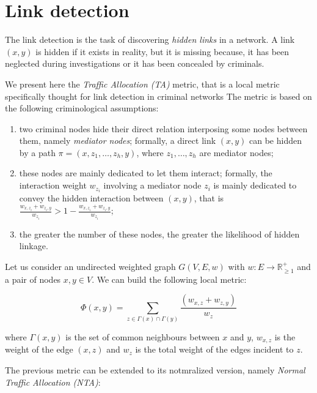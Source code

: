 \section{Link detection}
\label{sec:link-detection}

The link detection is the task of discovering \textit{hidden links} in a network. 
A link $(x,y)$ is hidden if it exists in reality, but it is missing because, it has been neglected during investigations or it has been concealed by criminals.

We present here the \textit{Traffic Allocation (TA)} metric, that is a local metric specifically thought for link detection in criminal networks 
The metric is based on the following criminological assumptions: 

\begin{enumerate}
	\item two criminal nodes hide their direct relation interposing some nodes between them, namely \textit{mediator nodes}; formally, a direct link $(x,y)$ can be hidden by a path $\pi=(x,z_{1},\ldots,z_{h},y)$, where $z_{1},\ldots,z_{h}$ are mediator nodes;
	
	\item these nodes are mainly dedicated to let them interact; formally, the interaction weight $w_{z_{i}}$ involving a mediator node $z_{i}$ is mainly dedicated to convey the hidden interaction between $(x,y)$, that is $\frac{w_{x,z_{i}}+w_{z_{i},y}}{w_{z_{i}}} > 1- \frac{w_{x,z_{i}}+w_{z_{i},y}}{w_{z_{i}}}$;
	
	\item the greater the number of these nodes, the greater the likelihood of hidden linkage. 
\end{enumerate}

Let us consider an undirected weighted graph $G(V,E,w)$ with $w:E\rightarrow\mathbb{R}_{\geq1}^{+}$ and a pair of nodes $x,y\in V$.
We can build the following local metric:

\begin{equation}
\label{eqn:ta-local}
\Phi(x,y)=
\sum\limits_{z\in\Gamma(x)\cap\Gamma(y)}
\frac{(w_{x,z}+w_{z,y})}{w_{z}}
\end{equation}

where 
$\Gamma(x,y)$ is the set of common neighbours between $x$ and $y$,
$w_{x,z}$ is the weight of the edge $(x,z)$ and
$w_{z}$ is the total weight of the edges incident to $z$.

The previous metric can be extended to its notmralized version, namely \textit{Normal Traffic Allocation (NTA)}:

